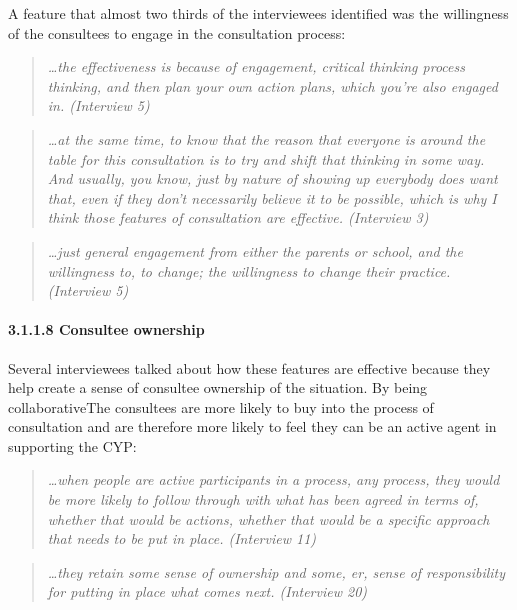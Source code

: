 \documentclass[
  english,
  man]{apa7}
\let\oldparagraph\paragraph
\renewcommand{\paragraph}[1]{\oldparagraph{#1}\mbox{}}
\begin{document}
A feature that almost two thirds of the interviewees identified was the willingness of the consultees to engage in the consultation process:

\begin{quote}
\emph{\ldots the effectiveness is because of engagement, critical thinking process
thinking, and then plan your own action plans, which you're also
engaged in. (Interview 5)}
\end{quote}

\begin{quote}
\emph{\ldots at the same time, to know that the reason that everyone is around the
table for this consultation is to try and shift that thinking in some
way. And usually, you know, just by nature of showing up everybody
does want that, even if they don't necessarily believe it to be
possible, which is why I think those features of consultation are
effective. (Interview 3)}
\end{quote}

\begin{quote}
\emph{\ldots just general engagement from either the parents or school, and the
willingness to, to change; the willingness to change their practice.
(Interview 5)}
\end{quote}

\hypertarget{consultee-ownership}{%
\paragraph{3.1.1.8 Consultee ownership}\label{consultee-ownership}}

Several interviewees talked about how these features are effective because they help create a sense of consultee ownership of the situation. By being collaborativeThe consultees are more likely to buy into the process of consultation and are therefore more likely to feel they can be an active agent in supporting the CYP:

\begin{quote}
\emph{\ldots when people are active participants in a process, any process, they
would be more likely to follow through with what has been agreed in
terms of, whether that would be actions, whether that would be a
specific approach that needs to be put in place. (Interview 11)}
\end{quote}

\begin{quote}
\emph{\ldots they retain some sense of ownership and some, er, sense of
responsibility for putting in place what comes next. (Interview 20)}
\end{quote}
\end{document}
